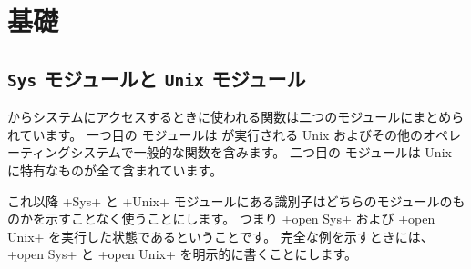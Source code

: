 %
%

\chapter{{基礎}}

\section{{\normalfont\texttt{Sys}} モジュールと {\normalfont\texttt{Unix} モジュール}}

\ocaml からシステムにアクセスするときに使われる関数は二つのモジュールにまとめられています。
一つ目の  モジュールは \ocaml が実行される Unix およびその他のオペレーティングシステムで一般的な関数を含みます。 二つ目の  モジュールは Unix に特有なものが全て含まれています。


これ以降 \ml+Sys+ と \ml+Unix+ モジュールにある識別子はどちらのモジュールのものかを示すことなく使うことにします。
つまり \ml+open Sys+ および \ml+open Unix+ を実行した状態であるということです。
完全な例を示すときには、\ml+open Sys+ と \ml+open Unix+ を明示的に書くことにします。

